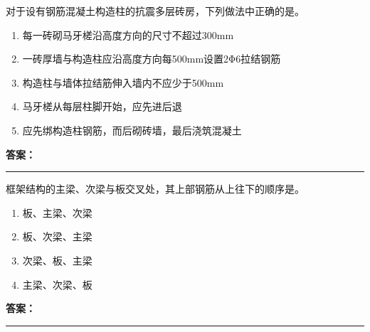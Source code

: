 \documentclass[UTF8,fontset=fandol,11pt]{ctexart}
\newcommand{\answerline}{\textcolor{answerred}{\rule{2.4cm}{0.7pt}}}
\begin{document}
\begin{quizbox}[title={乱序第 183 题｜第六章砌筑工程}]

对于设有钢筋混凝土构造柱的抗震多层砖房，下列做法中正确的是。\\

\begin{enumerate}[label=\Alph*.]

\item 每一砖砌马牙槎沿高度方向的尺寸不超过300mm

\item 一砖厚墙与构造柱应沿高度方向每500mm设置2Φ6拉结钢筋

\item 构造柱与墙体拉结筋伸入墙内不应少于500mm

\item 马牙槎从每层柱脚开始，应先进后退

\item 应先绑构造柱钢筋，而后砌砖墙，最后浇筑混凝土

\end{enumerate}

\textbf{\textcolor{answerred}{答案：}} \answerline

\end{quizbox}

\vspace{0.2em}

\begin{quizbox}[title={乱序第 184 题｜第四章混凝土结构工程}]

框架结构的主梁、次梁与板交叉处，其上部钢筋从上往下的顺序是。\\

\begin{enumerate}[label=\Alph*.]

\item 板、主梁、次梁

\item 板、次梁、主梁

\item 次梁、板、主梁

\item 主梁、次梁、板

\end{enumerate}

\textbf{\textcolor{answerred}{答案：}} \answerline

\end{quizbox}

\vspace{0.2em}
\end{document}
